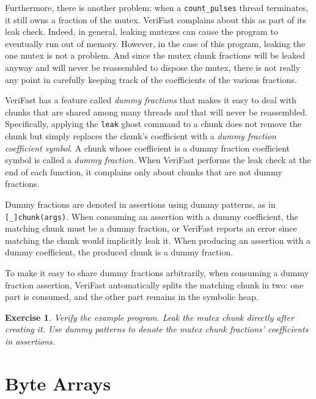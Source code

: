 \documentclass{article}
\newtheorem{exercise}{Exercise}
\begin{document}
Furthermore, there is another problem: when a
\lstinline!count_pulses! thread terminates, it still owns a
fraction of the mutex. VeriFast complains about this as part of
its leak check. Indeed, in general, leaking mutexes can cause
the program to eventually run out of memory. However, in the
case of this program, leaking the one mutex is not a problem.
And since the mutex chunk fractions will be leaked anyway and
will never be reassembled to dispose the mutex, there is not
really any point in carefully keeping track of the coefficients
of the various fractions.

VeriFast has a feature called \emph{dummy fractions} that makes
it easy to deal with chunks that are shared among many threads
and that will never be reassembled. Specifically, applying the
\lstinline!leak! ghost command to a chunk does not remove the
chunk but simply replaces the chunk's coefficient with a
\emph{dummy fraction coefficient symbol}. A chunk whose
coefficient is a dummy fraction coefficient symbol is called a
\emph{dummy fraction}. When VeriFast performs the leak check at
the end of each function, it complains only about chunks that
are not dummy fractions.

Dummy fractions are denoted in assertions using dummy patterns,
as in \lstinline![_]chunk(args)!. When consuming an assertion
with a dummy coefficient, the matching chunk must be a dummy
fraction, or VeriFast reports an error since matching the chunk
would implicitly leak it. When producing an assertion with a
dummy coefficient, the produced chunk is a dummy fraction.

To make it easy to share dummy fractions arbitrarily, when
consuming a dummy fraction assertion, VeriFast automatically
splits the matching chunk in two: one part is consumed, and the
other part remains in the symbolic heap.

\begin{exercise}\label{exercise:leaking}
Verify the example program. Leak the mutex chunk directly after
creating it. Use dummy patterns to denote the mutex chunk
fractions' coefficients in assertions.
\end{exercise}

\section{Byte Arrays}\label{section:arrays}
\end{document}
